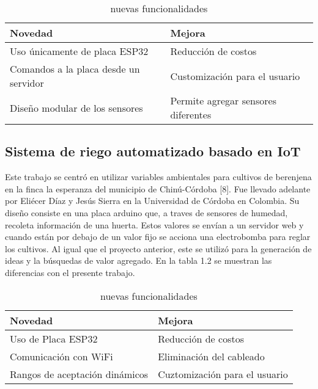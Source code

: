 \begin{table}[h]
	\centering
	\caption[comparativa 1 de nuevas funcionalidades]{nuevas funcionalidades}
	\begin{tabular}{l l}    
		\toprule
		\textbf{Novedad} & \textbf{Mejora}\\	
		\midrule
		Uso únicamente de placa ESP32           & Reducción de costos	\\		
		Comandos a la placa desde un servidor          & Customización para el usuario\\	
		Diseño modular de los sensores          & Permite agregar sensores diferentes\\	
		\bottomrule
		\hline
	\end{tabular}
	\label{tab:peces}
\end{table}

\subsection{Sistema de riego automatizado basado en IoT}
Este trabajo se centró en utilizar variables ambientales para cultivos de berenjena en la finca la esperanza del municipio de Chinú-Córdoba [8]. Fue llevado adelante por Eliécer Díaz y Jesús Sierra en la Universidad de Córdoba en Colombia. 
Su diseño consiste en una placa arduino que, a traves de sensores de humedad, recoleta información de una huerta. Estos valores se envían a un servidor web y cuando están por debajo de un valor fijo se acciona una electrobomba para reglar los cultivos. Al igual que el proyecto anterior, este se utilizó para la generación de ideas y la búsquedas de valor agregado. En la tabla 1.2 se muestran las diferencias con el presente trabajo.\\

\begin{table}[h]
	\centering
	\caption[comparativa 2 de nuevas funcionalidades]{nuevas funcionalidades}
	\begin{tabular}{l l}    
		\toprule
		\textbf{Novedad} & \textbf{Mejora}\\	
		\midrule
		Uso de Placa ESP32           & Reducción de costos	\\		
		Comunicación con WiFi          & Eliminación del cableado\\	
		Rangos de aceptación dinámicos          & Cuztomización para el usuario\\		
		\bottomrule
		\hline
	\end{tabular}
	\label{tab:peces}\\
\end{table}

